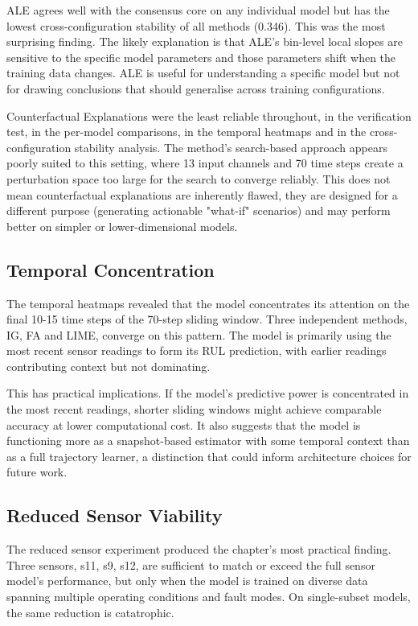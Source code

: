 ALE agrees well with the consensus core on any individual model but has the lowest cross-configuration stability of all methods (0.346). This was the most surprising finding. The likely explanation is that ALE's bin-level local slopes are sensitive to the specific model parameters and those parameters shift when the training data changes. ALE is useful for understanding a specific model but not for drawing conclusions that should generalise across training configurations.

Counterfactual Explanations were the least reliable throughout, in the verification test, in the per-model comparisons, in the temporal heatmaps and in the cross-configuration stability analysis. The method's search-based approach appears poorly suited to this setting, where 13 input channels and 70 time steps create a perturbation space too large for the search to converge reliably. This does not mean counterfactual explanations are inherently flawed, they are designed for a different purpose (generating actionable "what-if" scenarios) and may perform better on simpler or lower-dimensional models.

\subsection{Temporal Concentration}
The temporal heatmaps revealed that the model concentrates its attention on the final 10-15 time steps of the 70-step sliding window. Three independent methods, IG, FA and LIME, converge on this pattern. The model is primarily using the most recent sensor readings to form its RUL prediction, with earlier readings contributing context but not dominating.

This has practical implications. If the model's predictive power is concentrated in the most recent readings, shorter sliding windows might achieve comparable accuracy at lower computational cost. It also suggests that the model is functioning more as a snapshot-based estimator with some temporal context than as a full trajectory learner, a distinction that could inform architecture choices for future work.

\subsection{Reduced Sensor Viability}
The reduced sensor experiment produced the chapter's most practical finding. Three sensors, s11, s9, s12, are sufficient to match or exceed the full sensor model's performance, but only when the model is trained on diverse data spanning multiple operating conditions and fault modes. On single-subset models, the same reduction is catatrophic.

